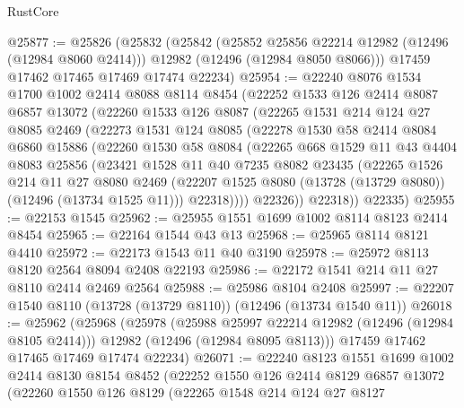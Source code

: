 \begin{lexlean}{RustCore}
\begin{coremodule}
@25877 := @25826
    (@25832
      (@25842
        (@25852 @25856 @22214 @12982 (@12496 (@12984 @8060 @2414)))
        @12982
        (@12496 (@12984 @8050 @8066)))
      @17459
      @17462
      @17465
      @17469
      @17474
      @22234)
@25954 := @22240
    @8076
    @1534
    @1700
    @1002
    @2414
    @8088
    @8114
    @8454
    (@22252
      @1533
      @126
      @2414
      @8087
      @6857
      @13072
      (@22260
        @1533
        @126
        @8087
        (@22265
          @1531
          @214
          @124
          @27
          @8085
          @2469
          (@22273
            @1531
            @124
            @8085
            (@22278
              @1530
              @58
              @2414
              @8084
              @6860
              @15886
              (@22260
                @1530
                @58
                @8084
                (@22265
                  @668
                  @1529
                  @11
                  @43
                  @4404
                  @8083
                  @25856
                  (@23421
                    @1528
                    @11
                    @40
                    @7235
                    @8082
                    @23435
                    (@22265
                      @1526
                      @214
                      @11
                      @27
                      @8080
                      @2469
                      (@22207 @1525 @8080 (@13728 (@13729 @8080)) (@12496 (@13734 @1525 @11)))
                      @22318))))
              @22326))
          @22318))
      @22335)
@25955 := @22153 @1545
@25962 := @25955 @1551 @1699 @1002 @8114 @8123 @2414 @8454
@25965 := @22164 @1544 @43 @13
@25968 := @25965 @8114 @8121 @4410
@25972 := @22173 @1543 @11 @40 @3190
@25978 := @25972 @8113 @8120 @2564 @8094 @2408 @22193
@25986 := @22172 @1541 @214 @11 @27 @8110 @2414 @2469 @2564
@25988 := @25986 @8104 @2408
@25997 := @22207 @1540 @8110 (@13728 (@13729 @8110)) (@12496 (@13734 @1540 @11))
@26018 := @25962
    (@25968
      (@25978
        (@25988 @25997 @22214 @12982 (@12496 (@12984 @8105 @2414)))
        @12982
        (@12496 (@12984 @8095 @8113)))
      @17459
      @17462
      @17465
      @17469
      @17474
      @22234)
@26071 := @22240
    @8123
    @1551
    @1699
    @1002
    @2414
    @8130
    @8154
    @8452
    (@22252
      @1550
      @126
      @2414
      @8129
      @6857
      @13072
      (@22260
        @1550
        @126
        @8129
        (@22265
          @1548
          @214
          @124
          @27
          @8127

\end{coremodule}
\end{lexlean}
